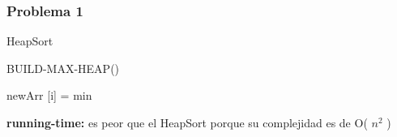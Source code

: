 \documentclass{beamer}
\begin{document}
\begin{frame}

    \frametitle{Problema 1}
    \begin{algorithm}[H]
        \caption{HeapSort}
        \begin{algorithmic}[1]
        \State BUILD-MAX-HEAP()
        
			\EndIf	
		\EndFor
		\State newArr [i] = min 
	\EndFor
	\EndProcedure
        \end{algorithmic}
    \end{algorithm}
    \textbf{running-time:} es peor que el HeapSort porque su complejidad es de O( $n^2$ ) 
    \end{frame}
\end{document}
